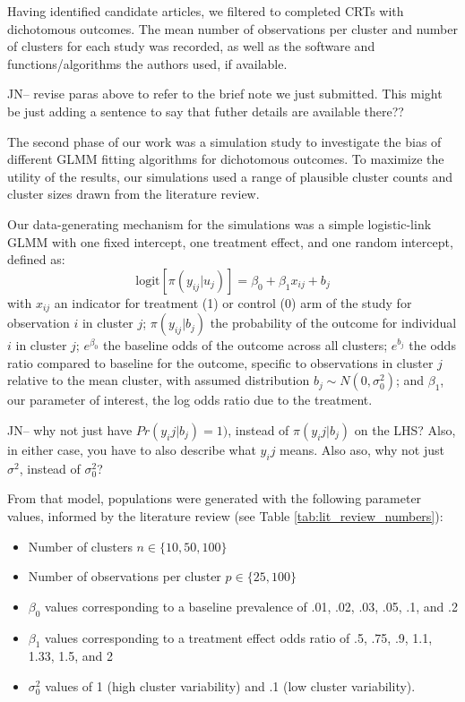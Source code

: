 \documentclass{article}
\begin{document}
\begin{flushleft}
Having identified candidate articles, we filtered to completed CRTs with dichotomous outcomes. The mean number of observations per cluster and number of clusters for each study was recorded, as well as the software and functions/algorithms the authors used, if available.


JN-- revise paras above to refer to the brief note we just submitted.  This might be just adding a sentence to say that futher details are available there??  


The second phase of our work was a simulation study to investigate the bias of different GLMM fitting algorithms for dichotomous outcomes. To maximize the utility of the results, our simulations used a range of plausible cluster counts and cluster sizes drawn from the literature review.

Our data-generating mechanism for the simulations was a simple logistic-link GLMM with one fixed intercept, one treatment effect, and one random intercept, defined as:
\begin{equation}
    \text{logit}[\pi(y_{ij}|u_j)]=\beta_0 + \beta_1 x_{ij} + b_j
\end{equation}
with $x_{ij}$ an indicator for treatment (1) or control (0) arm of the study for observation $i$ in cluster $j$; $\pi(y_{ij}|b_j)$ the probability of the outcome for individual $i$ in cluster $j$; $e^{\beta_0}$ the baseline odds of the outcome across all clusters; $e^{b_j}$ the odds ratio compared to baseline for the outcome, specific to observations in cluster $j$ relative to the mean cluster, with assumed distribution $b_j \sim N(0, \sigma_{0}^2)$; and $\beta_1$, our parameter of interest, the log odds ratio due to the treatment. 

JN-- why not just have $Pr(y_ij|b_j) = 1)$, instead of $\pi(y_ij|b_j)$ on the LHS?  Also, in either case, you have to also describe what $y_ij$ means.  Also aso, why not just $\sigma^2$, instead of $\sigma^2_0$?


From that model, populations were generated with the following parameter values, informed by the literature review (see Table \ref{tab:lit_review_numbers}):
\begin{itemize}
    \item Number of clusters $n \in \{10, 50, 100\}$
    \item Number of observations per cluster $p \in \{25, 100\}$
    \item $\beta_0$ values corresponding to a baseline prevalence of .01, .02, .03, .05, .1, and .2
    \item $\beta_1$ values corresponding to a treatment effect odds ratio of .5, .75, .9, 1.1, 1.33, 1.5, and 2
    \item $\sigma^2_0$ values of 1 (high cluster variability) and .1 (low cluster variability).
\end{itemize}


\end{flushleft}
\end{document}
